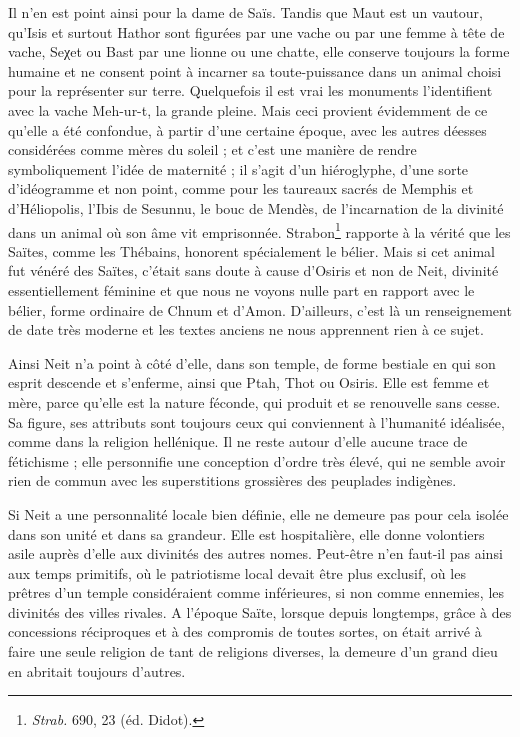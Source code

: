 \documentclass[letterpaper,twocolumn,openany,nodeprecatedcode]{dndbook}
\begin{document}
Il n'en est point ainsi pour la dame de Saïs. Tandis que Maut est un vautour, qu'Isis et surtout Hathor sont figurées par une vache ou par une femme à tête de vache, Seχet ou Bast par une lionne ou une chatte, elle conserve toujours la forme humaine et ne consent point à incarner sa toute-puissance dans un animal choisi pour la représenter sur terre. Quelquefois il est vrai les monuments l'identifient avec la vache Meh-ur-t, la grande pleine. Mais ceci provient évidemment de ce qu’elle a été confondue, à partir d'une certaine époque, avec les autres déesses considérées comme mères du soleil ; et c'est une manière de rendre symboliquement l'idée de maternité ; il s'agit d'un hiéroglyphe, d'une sorte d'idéogramme et non point, comme pour les taureaux sacrés de Memphis et d'Héliopolis, l'Ibis de Sesunnu, le bouc de Mendès, de l'incarnation de la divinité dans un animal où son âme vit emprisonnée. Strabon\footnote{\emph{Strab.} 690, 23 (éd. Didot).} rapporte à la vérité que les Saïtes, comme les Thébains, honorent spécialement le bélier. Mais si cet animal fut vénéré des Saïtes, c'était sans doute à cause d'Osiris et non de Neit, divinité essentiellement féminine et que nous ne voyons nulle part en rapport avec le bélier, forme ordinaire de Chnum et d'Amon. D'ailleurs, c'est là un renseignement de date très moderne et les textes anciens ne nous apprennent rien à ce sujet.

Ainsi Neit n'a point à côté d'elle, dans son temple, de forme bestiale en qui son esprit descende et s'enferme, ainsi que Ptah, Thot ou Osiris. Elle est femme et mère, parce qu’elle est la nature féconde, qui produit et se renouvelle sans cesse. Sa figure, ses attributs sont toujours ceux qui conviennent à l'humanité idéalisée, comme dans la religion hellénique. Il ne reste autour d'elle aucune trace de fétichisme ; elle personnifie une conception d'ordre très élevé, qui ne semble avoir rien de commun avec les superstitions grossières des peuplades indigènes.

Si Neit a une personnalité locale bien définie, elle ne demeure pas pour cela isolée dans son unité et dans sa grandeur. Elle est hospitalière, elle donne volontiers asile auprès d'elle aux divinités des autres nomes. Peut-être n'en faut-il pas ainsi aux temps primitifs, où le patriotisme local devait être plus exclusif, où les prêtres d'un temple considéraient comme inférieures, si non comme ennemies, les divinités des villes rivales. A l'époque Saïte, lorsque depuis longtemps, grâce à des concessions réciproques et à des compromis de toutes sortes, on était arrivé à faire une seule religion de tant de religions diverses, la demeure d'un grand dieu en abritait toujours d'autres.
\end{document}
